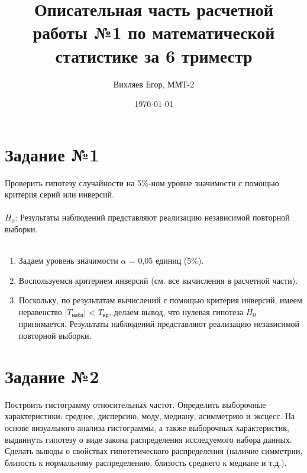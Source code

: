 \documentclass[12pt, letterpaper, twoside]{article}
\title{Описательная часть расчетной работы №1 по математической статистике за 6 триместр}
\author{Вихляев Егор, ММТ-2}
\date\today
\begin{document}
\maketitle

\section{Задание №1}

Проверить гипотезу случайности на 5$\%$-ном уровне значимости с помощью
критерия серий или инверсий.
\\ \\

$H_0$:  Результаты наблюдений представляют реализацию независимой повторной
выборки.\\ \\

\begin{enumerate} 
	\item Задаем уровень значимости  $\alpha$ = 0,05 единиц (5$\%$).
	\item Воспользуемся критерием инверсий (см. все вычисления в расчетной части).
	\item Поскольку, по результатам вычислений с помощью критерия инверсий, имеем неравенство $|T_{\text{набл}}|$ < $T_{\text{кр}}$, делаем вывод, что нулевая гипотеза $H_0$ принимается. Результаты наблюдений представляют реализацию независимой повторной выборки.
\end{enumerate}

\section{Задание №2}

Построить гистограмму относительных частот. Определить выборочные
характеристики: среднее, дисперсию, моду, медиану, асимметрию и эксцесс.
На основе визуального анализа гистограммы, а также выборочных
характеристик, выдвинуть гипотезу о виде закона распределения
исследуемого набора данных. Сделать выводы о свойствах гипотетического
распределения (наличие симметрии, близость к нормальному
распределению, близость среднего к медиане и т.д.).
\end{document}
